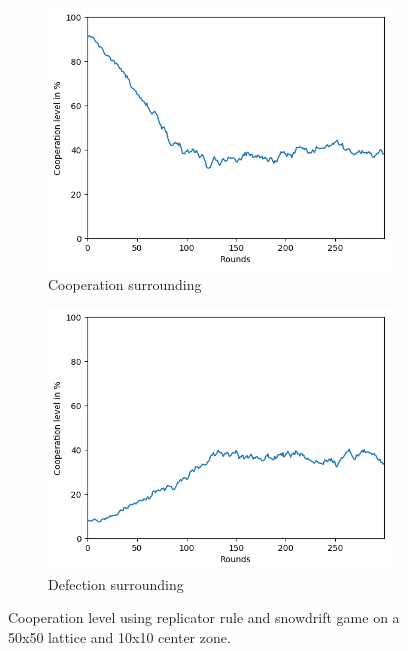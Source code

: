 \documentclass[letterpaper]{article}
\begin{document}
\begin{figure}[H]
    \begin{subfigure}{.5\textwidth}
        \centering
        \includegraphics[width=1\linewidth]
        {images/assign2/part32-coop/coop.png}
        \caption{Cooperation surrounding}
        \label{fig:part32-coop}
    \end{subfigure}
    \begin{subfigure}{.5\textwidth}
        \centering
        \includegraphics[width=1\linewidth]
        {images/assign2/part32-defect/coop.png}
        \caption{Defection surrounding}
        \label{fig:part32-defect}
    \end{subfigure}
    \caption{Cooperation level using replicator rule and
    snowdrift game on a 50x50 lattice and 10x10 center zone.}
    \label{fig:50part2}
\end{figure}
\end{document}
